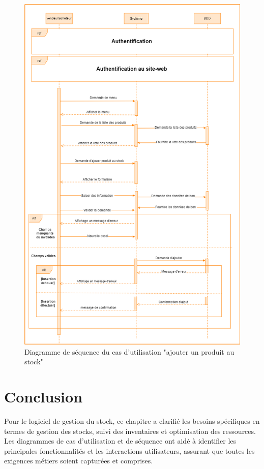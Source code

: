 \documentclass[edit,12pt,a4paper,ChapStyle,oneside,doubleinterligne]{report}
\begin{document}
\begin{figure}[h!]\label{fig:Diagramme cas1}
\centering
\includegraphics[width=1\textwidth]{images/seq ajouter un produit au stock.png}
\caption{Diagramme de séquence du cas d'utilisation "ajouter un produit au stock"}
\end{figure}
\clearpage
\section{Conclusion}
Pour le logiciel de gestion du stock, ce chapitre a clarifié les besoins spécifiques en termes de gestion des stocks, suivi des inventaires et optimisation des ressources. Les diagrammes de cas d'utilisation et de séquence ont aidé à identifier les principales fonctionnalités et les interactions utilisateurs, assurant que toutes les exigences métiers soient capturées et comprises.
\end{document}
